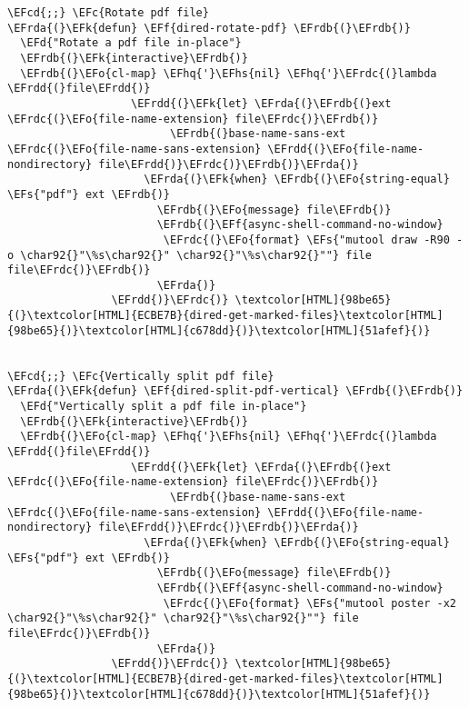 \documentclass[a4wide,10pt]{article}
\newcommand{\EFc}[1]{\textcolor{EFc}{#1}} %
\newcommand{\EFcd}[1]{\textcolor{EFcd}{#1}} %
\newcommand{\EFs}[1]{\textcolor{EFs}{#1}} %
\newcommand{\EFd}[1]{\textcolor{EFd}{#1}} %
\newcommand{\EFk}[1]{\textcolor{EFk}{#1}} %
\newcommand{\EFf}[1]{\textcolor{EFf}{#1}} %
\newcommand{\EFo}[1]{\textcolor{EFo}{#1}} %
\newcommand{\EFhq}[1]{\textcolor{EFhq}{#1}} %
\newcommand{\EFhs}[1]{\textcolor{EFhs}{#1}} %
\newcommand{\EFrda}[1]{\textcolor{EFrda}{#1}} %
\newcommand{\EFrdb}[1]{\textcolor{EFrdb}{#1}} %
\newcommand{\EFrdc}[1]{\textcolor{EFrdc}{#1}} %
\newcommand{\EFrdd}[1]{\textcolor{EFrdd}{#1}} %
\begin{document}
\begin{Code}
\begin{Verbatim}
\EFcd{;;} \EFc{Rotate pdf file}
\EFrda{(}\EFk{defun} \EFf{dired-rotate-pdf} \EFrdb{(}\EFrdb{)}
  \EFd{"Rotate a pdf file in-place"}
  \EFrdb{(}\EFk{interactive}\EFrdb{)}
  \EFrdb{(}\EFo{cl-map} \EFhq{'}\EFhs{nil} \EFhq{'}\EFrdc{(}lambda \EFrdd{(}file\EFrdd{)}
                   \EFrdd{(}\EFk{let} \EFrda{(}\EFrdb{(}ext \EFrdc{(}\EFo{file-name-extension} file\EFrdc{)}\EFrdb{)}
                         \EFrdb{(}base-name-sans-ext \EFrdc{(}\EFo{file-name-sans-extension} \EFrdd{(}\EFo{file-name-nondirectory} file\EFrdd{)}\EFrdc{)}\EFrdb{)}\EFrda{)}
                     \EFrda{(}\EFk{when} \EFrdb{(}\EFo{string-equal} \EFs{"pdf"} ext \EFrdb{)}
                       \EFrdb{(}\EFo{message} file\EFrdb{)}
                       \EFrdb{(}\EFf{async-shell-command-no-window}
                        \EFrdc{(}\EFo{format} \EFs{"mutool draw -R90 -o \char92{}"\%s\char92{}" \char92{}"\%s\char92{}""} file file\EFrdc{)}\EFrdb{)}
                       \EFrda{)}
                \EFrdd{)}\EFrdc{)} \textcolor[HTML]{98be65}{(}\textcolor[HTML]{ECBE7B}{dired-get-marked-files}\textcolor[HTML]{98be65}{)}\textcolor[HTML]{c678dd}{)}\textcolor[HTML]{51afef}{)}


\EFcd{;;} \EFc{Vertically split pdf file}
\EFrda{(}\EFk{defun} \EFf{dired-split-pdf-vertical} \EFrdb{(}\EFrdb{)}
  \EFd{"Vertically split a pdf file in-place"}
  \EFrdb{(}\EFk{interactive}\EFrdb{)}
  \EFrdb{(}\EFo{cl-map} \EFhq{'}\EFhs{nil} \EFhq{'}\EFrdc{(}lambda \EFrdd{(}file\EFrdd{)}
                   \EFrdd{(}\EFk{let} \EFrda{(}\EFrdb{(}ext \EFrdc{(}\EFo{file-name-extension} file\EFrdc{)}\EFrdb{)}
                         \EFrdb{(}base-name-sans-ext \EFrdc{(}\EFo{file-name-sans-extension} \EFrdd{(}\EFo{file-name-nondirectory} file\EFrdd{)}\EFrdc{)}\EFrdb{)}\EFrda{)}
                     \EFrda{(}\EFk{when} \EFrdb{(}\EFo{string-equal} \EFs{"pdf"} ext \EFrdb{)}
                       \EFrdb{(}\EFo{message} file\EFrdb{)}
                       \EFrdb{(}\EFf{async-shell-command-no-window}
                        \EFrdc{(}\EFo{format} \EFs{"mutool poster -x2 \char92{}"\%s\char92{}" \char92{}"\%s\char92{}""} file file\EFrdc{)}\EFrdb{)}
                       \EFrda{)}
                \EFrdd{)}\EFrdc{)} \textcolor[HTML]{98be65}{(}\textcolor[HTML]{ECBE7B}{dired-get-marked-files}\textcolor[HTML]{98be65}{)}\textcolor[HTML]{c678dd}{)}\textcolor[HTML]{51afef}{)}


\end{Verbatim}
\end{Code}
\end{document}

